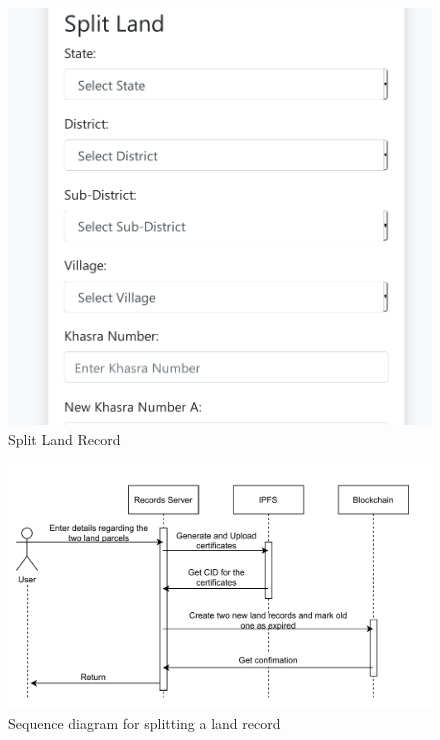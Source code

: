 \documentclass{article}
\begin{document}
            \begin{figure}[htbp]
                \includegraphics[scale=0.25]{records_split}
                \centering
                \caption{Split Land Record}
            \end{figure}

            \begin{figure}[htbp]
                \includegraphics[scale=0.25]{records_seq_split_land}
                \centering
                \caption{Sequence diagram for splitting a land record}
            \end{figure}
            
\end{document}
